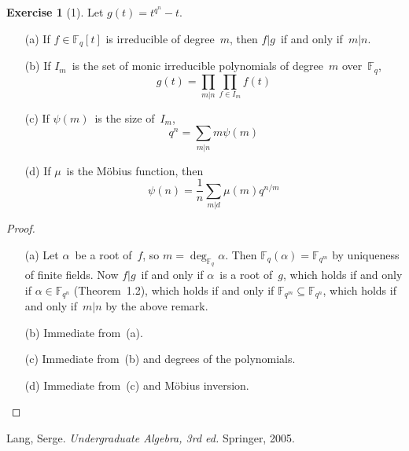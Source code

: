 \documentclass[letterpaper,12pt]{article}
\newcommand{\F}{\mathbb{F}}
\theoremstyle{definition}
\newtheorem*{exer}{Exercise}
\theoremstyle{remark}
\theoremstyle{direction}
\begin{document}
\begin{exer}[1]
Let \(g(t)=t^{q^n}-t\).
\begin{enumerate}[itemsep=0pt]
\item[(a)] If \(f\in\F_q[t]\) is irreducible of degree~\(m\), then \(f|g\)~if and only if~\(m|n\).
\item[(b)] If \(I_m\)~is the set of monic irreducible polynomials of degree~\(m\) over~\(\F_q\),
\[g(t)=\prod_{m|n}\prod_{f\in I_m}f(t)\]
\item[(c)] If \(\psi(m)\)~is the size of~\(I_m\),
\[q^n=\sum_{m|n}m\psi(m)\]
\item[(d)] If \(\mu\)~is the M\"obius function, then
\[\psi(n)=\frac{1}{n}\sum_{m|d}\mu(m)q^{n/m}\]
\end{enumerate}
\end{exer}
\begin{proof}\
\begin{enumerate}[itemsep=0pt]
\item[(a)] Let \(\alpha\)~be a root of~\(f\), so \(m=\deg_{\F_q}\alpha\). Then \(\F_q(\alpha)=\F_{q^m}\) by uniqueness of finite fields. Now \(f|g\)~if and only if \(\alpha\)~is a root of~\(g\), which holds if and only if \(\alpha\in\F_{q^n}\) (Theorem~1.2), which holds if and only if \(\F_{q^m}\subseteq\F_{q^n}\), which holds if and only if~\(m|n\) by the above remark.
\item[(b)] Immediate from~(a).
\item[(c)] Immediate from~(b) and degrees of the polynomials.
\item[(d)] Immediate from~(c) and M\"obius inversion.\qedhere
\end{enumerate}
\end{proof}

\begin{thebibliography}{0}
 Lang, Serge. \textit{Undergraduate Algebra, 3rd ed.} Springer, 2005.
\end{thebibliography}
\end{document}
